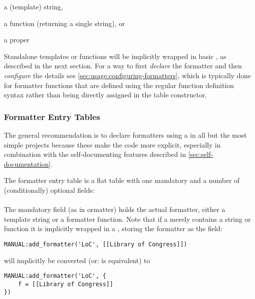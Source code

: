 \documentclass[12pt]{scrartcl}
\begin{document}
\begin{itemize*}
\item a (template) string,
\item a function (returning a single string), or
\item a proper 
\end{itemize*}

Standalone templates or functions will be implicitly wrapped in basic
, as described in the next
section. For a way to first \emph{declare} the formatter and then
\emph{configure} the details see \vref{sec:usage:configuring-formatters}, which
is typically done for formatter functions that are defined using the regular
function definition syntax rather than being directly assigned in the table
constructor.


\subsubsection{Formatter Entry Tables}
\label{sec:usage-formatter-entry-tables}

The general recommendation is to declare formatters using a  in all but the most simple projects because these make the code
more explicit, especially in combination with the self-documenting features
described in \vref{sec:self-documentation}.

The formatter entry table is a flat table with one mandatory and a number of
(conditionally) optional fields:

\paragraph{}

The mandatory field  (as in ormatter) holds the
actual formatter, either a template string or a formatter function.  Note that
if a  merely contains a string or function it is
implicitly wrapped in a , storing the formatter as
the  field:


\begin{verbatim}
MANUAL:add_formatter('LoC', [[Library of Congress]])
\end{verbatim}

\noindent will implicitly be converted (or: is equivalent) to

\begin{verbatim}
MANUAL:add_formatter('LoC', {
	f = [[Library of Congress]]
})
\end{verbatim}
\end{document}
